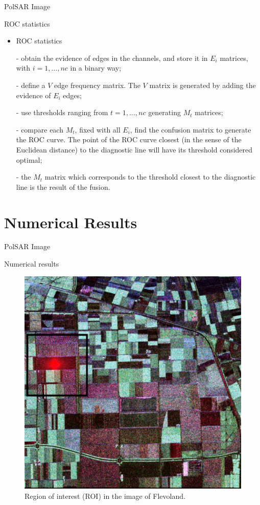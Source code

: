 \documentclass[10pt]{beamer}
\begin{document}
\begin{frame}[fragile]{PolSAR Image}
\begin{alertblock}{ROC statistics}
\begin{itemize}
	\item ROC statistics
	\item[-] obtain the evidence of edges in the channels, and store it in $E_i$ matrices, with $i=1,\dots,nc$ in a binary way;
\item[-] define a $V$ edge frequency matrix. The $V$ matrix is generated by adding the evidence of $E_i$ edges;
\item[-] use thresholds ranging from $t=1,\dots,nc$ generating $M_t$ matrices;
\item[-] compare each $M_t$, fixed with all $E_i$, find the confusion matrix to generate the ROC curve. The point of the ROC curve closest (in the sense of the Euclidean distance) to the diagnostic line will have its threshold considered optimal;
\item[-] the $M_t$ matrix which corresponds to the threshold closest to the diagnostic line is the result of the fusion.
\end{itemize}
\end{alertblock}
\end{frame}

\section{Numerical Results}
\begin{frame}[fragile]{PolSAR Image}
\begin{alertblock}{Numerical results}
	\begin{figure}[hbt]
\centering
	\includegraphics[width=.5\linewidth]{flevoland_radial_4_look_black}
	\caption{Region of interest (ROI) in the image of Flevoland.}
\label{flevoland_radial_4look}
\end{figure}
\end{alertblock}
\end{frame}
\end{document}

